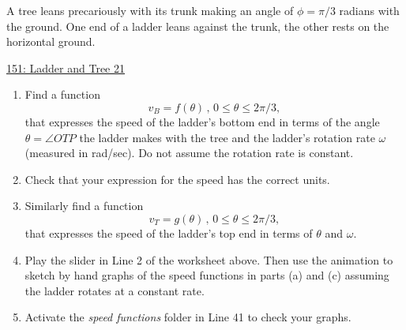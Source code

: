 \documentclass{ximera}
\begin{document}
\begin{question} \label{Q43hhbdsfdsfdszz}

A tree leans precariously with its trunk making an angle of $\phi = \pi/3$ radians with the ground. One end of a ladder leans against the trunk, the other rests on the horizontal ground. %


 
\begin{onlineOnly}
   \begin{center}
\end{center}
\end{onlineOnly}

\href{https://www.desmos.com/calculator/bscbpblji1}{151: Ladder and Tree 21}


\begin{enumerate}
\item Find a function
\[
    v_B = f(\theta) \, , \,  0\leq \theta \leq 2\pi/3 ,
\]
that expresses the speed of the ladder's bottom end in terms of the angle $\theta = \angle OTP$ the ladder makes with the tree and the ladder's rotation rate $\omega$ (measured in rad/sec). Do not assume the rotation rate is constant.

\item Check that your expression for the speed has the correct units.

\item Similarly find a function 
\[
    v_T = g(\theta) \, , \,  0\leq \theta \leq 2\pi/3 ,
\]
that expresses the speed of the ladder's top end in terms of $\theta$ and $\omega$.

\item Play the slider in Line 2 of the worksheet above. Then use the animation to sketch by hand graphs of the speed functions in parts (a) and (c) assuming the ladder rotates at a constant rate.

\item Activate the \emph{speed functions} folder in Line 41 to check your graphs.


\end{enumerate}
\end{question}
\end{document}
